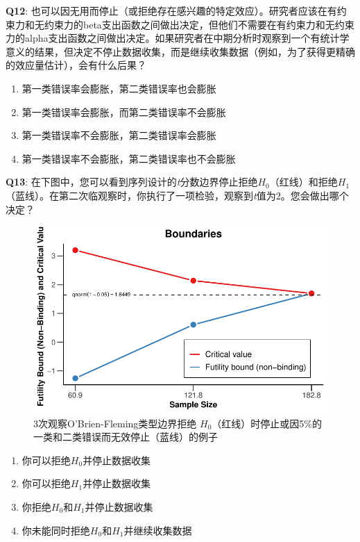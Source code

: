 \documentclass[
  letterpaper,
  DIV=11,
  numbers=noendperiod]{scrreprt}
\providecommand{\tightlist}{%
  \setlength{\itemsep}{0pt}\setlength{\parskip}{0pt}}\usepackage{longtable,booktabs,array}
\begin{document}
\textbf{Q12}:
也可以因无用而停止（或拒绝存在感兴趣的特定效应）。研究者应该在有约束力和无约束力的beta支出函数之间做出决定，但他们不需要在有约束力和无约束力的alpha支出函数之间做出决定。如果研究者在中期分析时观察到一个有统计学意义的结果，但决定不停止数据收集，而是继续收集数据（例如，为了获得更精确的效应量估计），会有什么后果？

\begin{enumerate}
\def\labelenumi{\Alph{enumi})}
\tightlist
\item
  第一类错误率会膨胀，第二类错误率也会膨胀
\item
  第一类错误率会膨胀，而第二类错误率不会膨胀
\item
  第一类错误率不会膨胀，第二类错误率会膨胀
\item
  第一类错误率不会膨胀，第二类错误率也不会膨胀
\end{enumerate}

\textbf{Q13}:
在下图中，您可以看到序列设计的\emph{t}分数边界停止拒绝\(H_0\)（红线）和拒绝\(H_1\)（蓝线）。在第二次临观察时，你执行了一项检验，观察到\emph{t}值为2。您会做出哪个决定？

\begin{figure}

{\centering \includegraphics[width=1\textwidth,height=\textheight]{10-sequential_files/figure-pdf/fig-futilityq13-1.pdf}

}

\caption{\label{fig-futilityq13}3次观察O'Brien-Fleming类型边界拒绝
\(H_0\)（红线）时停止或因5\%的一类和二类错误而无效停止（蓝线）的例子}

\end{figure}

\begin{enumerate}
\def\labelenumi{\Alph{enumi})}
\tightlist
\item
  你可以拒绝\(H_0\)并停止数据收集
\item
  你可以拒绝\(H_1\)并停止数据收集
\item
  你拒绝\(H_0\)和\(H_1\)并停止数据收集
\item
  你未能同时拒绝\(H_0\)和\(H_1\)并继续收集数据
\end{enumerate}
\end{document}
